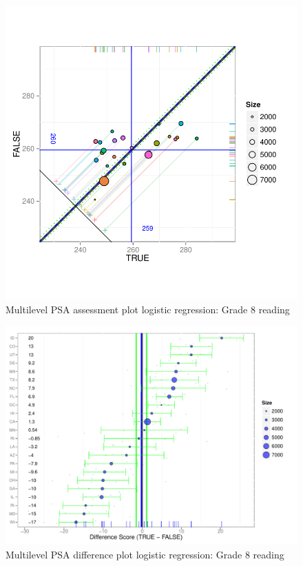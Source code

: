 \begin{figure}[h!]
\begin{center}
\includegraphics[width=\textwidth]{../Figures2009/g8read-mlpsa-lr-circ.pdf}
\caption{Multilevel PSA assessment plot logistic regression: Grade 8 reading}
\end{center}
\end{figure}

\begin{figure}[h!]
\begin{center}
\includegraphics[width=\textwidth]{../Figures2009/g8read-mlpsa-lr-diff.pdf}
\caption{Multilevel PSA difference plot logistic regression: Grade 8 reading}
\end{center}
\end{figure}

